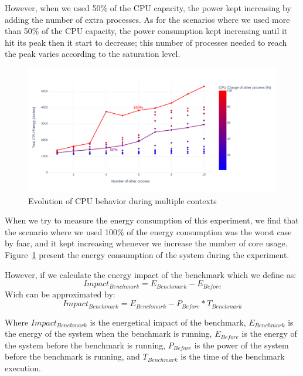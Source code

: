 However, when we used 50\% of the CPU capacity, the power kept increasing by adding the number of extra processes. As for the scenarios where we used more than 50\% of the CPU capacity, the power consumption kept increasing until it hit its peak then it start to decrease; this number of processes needed to reach the peak varies according to the saturation level.
\begin{figure}[!h]
      \centering
      \caption{Evolution of CPU behavior during multiple contexts }
      \label{fig:green_faas_energy}
      \includegraphics[width=\linewidth]{chapters/green_faas_energy}
\end{figure}

When we try to measure the energy consumption of this experiment, we find that the scenario where we used 100\% of the energy consumption was the worst case by faar, and it kept increasing whenever we increase the number of core usage. Figure~\ref{fig:green_faas_energy} present the energy consumption of the system during the experiment.

However, if we calculate the energy impact of the benchmark which we define as: 
\begin{equation}
      Impact_{Benchmark} =E_{Benchmark} - E_{Before}
\end{equation}
Wich can be approximated by: 
\begin{equation}
      Impact_{Benchmark} =E_{Benchmark} - P_{Before} * T_{Benchmark}
\end{equation}

Where $Impact_{Benchmark}$ is the energetical impact of the benchmark, $E_{Benchmark}$ is the energy of the system when the benchmark is running, $E_{Before}$ is the energy of the system before the benchmark is running, $P_{Before}$ is the power of the system before the benchmark is running, and $T_{Benchmark}$ is the time of the benchmark execution.

